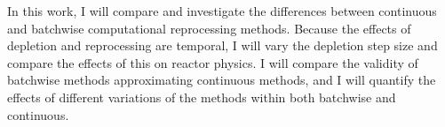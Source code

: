 In this work, I will compare and investigate the differences between continuous and batchwise computational reprocessing methods.
Because the effects of depletion and reprocessing are temporal, I will vary the depletion step size and compare the effects of this on reactor physics.
I will compare the validity of batchwise methods approximating continuous methods, and I will quantify the effects of different variations of the methods within both batchwise and continuous.
